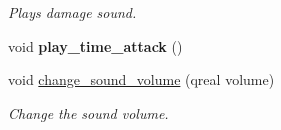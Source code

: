 \begin{DoxyCompactItemize}
\begin{DoxyCompactList}\small\item\em Plays damage sound. \end{DoxyCompactList}\item 
\hypertarget{class_game_state_a1a994e352fb5b95a3b05a0b1ebbe7b32}{void {\bfseries play\-\_\-time\-\_\-attack} ()}\label{class_game_state_a1a994e352fb5b95a3b05a0b1ebbe7b32}

\item 
\hypertarget{class_game_state_a2d8c0d7ab3a8bbb9be5daddf8a9154e5}{void \hyperlink{class_game_state_a2d8c0d7ab3a8bbb9be5daddf8a9154e5}{change\-\_\-sound\-\_\-volume} (qreal volume)}\label{class_game_state_a2d8c0d7ab3a8bbb9be5daddf8a9154e5}

\begin{DoxyCompactList}\small\item\em Change the sound volume. \end{DoxyCompactList}\end{DoxyCompactItemize}
